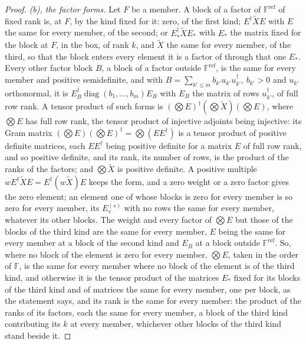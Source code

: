 \begin{proof}
\emph{(b), the factor forms.} Let $F$ be a member. A block of a factor of
$\mathbb{F}^{\mathrm{ref}}$ of fixed rank is, at $F$, by the kind fixed for
it: zero, of the first kind; $E^{\dagger}\widetilde XE$ with $E$ the same
for every member, of the second; or $E_{*}^{\dagger}\widetilde XE_{*}$ with
$E_{*}$ the matrix fixed for the block at $F$, in the box, of rank $k$, and
$\widetilde X$ the same for every member, of the third, so that the block
enters every element it is a factor of through that one $E_{*}$. Every
other factor block $B$, a block of a factor outside
$\mathbb{F}^{\mathrm{ref}}$, is the same for every member and positive
semidefinite, and with $B=\sum_{k'\le m}b_{k'}u_{k'}u_{k'}^{\dagger}$,
$b_{k'}>0$ and $u_{k'}$ orthonormal, it is
$E_B^{\dagger}\operatorname{diag}(b_1,\dots,b_m)E_B$ with $E_B$ the matrix
of rows $u_{k'}^{\dagger}$, of full row rank. A tensor product of such forms
is $(\bigotimes E)^{\dagger}(\bigotimes\widetilde X)(\bigotimes E)$, where
$\bigotimes E$ has full row rank, the tensor product of injective adjoints
being injective: its Gram matrix
$(\bigotimes E)(\bigotimes E)^{\dagger}=\bigotimes(EE^{\dagger})$ is a tensor
product of positive definite matrices, each $EE^{\dagger}$ being positive
definite for a matrix $E$ of full row rank, and so positive definite, and its
rank, its number of rows, is the product of the ranks of the factors; and
$\bigotimes\widetilde X$ is positive definite. A positive multiple
$wE^{\dagger}\widetilde XE=E^{\dagger}(w\widetilde X)E$ keeps the form, and a
zero weight or a zero factor gives the zero element; an element one of whose
blocks is zero for every member is so zero for every member, its
$E^{(s)}_v$ with no rows the same for every member, whatever its other
blocks. The weight and every
factor of $\bigotimes E$ but those of the blocks of the third kind are the
same for every member, $E$ being the same for every member at a block of the
second kind and $E_B$ at a block outside $\mathbb{F}^{\mathrm{ref}}$. So,
where no block of the element is zero for every member, $\bigotimes E$, taken
in the order of $\mathbb{F}$, is the same for every member where no block of
the element is of the third kind, and otherwise it is the tensor product of
the matrices $E_{*}$ fixed for its blocks of the third kind and of matrices
the same for every member, one per block, as the statement says, and its
rank is the same for every member: the product of the ranks of its factors,
each the same for every member, a block of the third kind contributing its
$k$ at every member, whichever other blocks of the third kind stand beside
it.


\end{proof}
